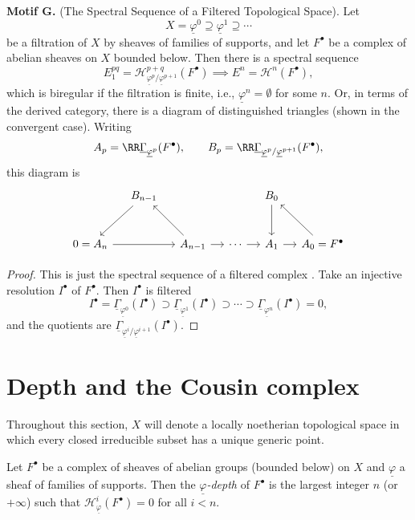 \medskip{}\label{motif:4.1.G}\noindent\textbf{Motif G.} (The Spectral Sequence of a Filtered Topological Space). Let
\[
X = \underline{\varphi}^0 \supseteq \underline{\varphi}^1 \supseteq \cdots
\]
be a filtration of $X$ by sheaves of families of supports, and let $F^\bullet$ be a complex of abelian sheaves on $X$ bounded below. Then there is a spectral sequence
\[
E_1^{pq}=\mathcal{H}^{p+q}_{\underline{\varphi}^p/\underline{\varphi}^{p+1}}(F^\bullet)\implies E^n=\mathcal{H}^n(F^\bullet),
\]
which is biregular \cite[\nopp $0_{\mathrm{III}}$, \S11]{EGA} if the filtration is finite, i.e., $\underline{\varphi}^n=\emptyset$ for some $n$. Or, in terms of the derived category, there is a diagram of distinguished triangles (shown in the convergent case).
Writing
\[
A_p=\RR\underline{\Gamma}_{\underline{\varphi}^p}(F^\bullet),
\qquad B_p=\RR\underline{\Gamma}_{\underline{\varphi}^p/\underline{\varphi}^{p+1}}(F^\bullet),
\]
this diagram is
\[
\begin{tikzcd}[row sep=large, column sep=small]
 & B_{n-1} \arrow[dl] & & & B_0 \arrow[d] & \\
0=A_n \arrow[rr] & & A_{n-1} \arrow[ul] \arrow[r]
 & \cdots \arrow[r] & A_1 \arrow[r] & A_0=F^\bullet \arrow[ul]
\end{tikzcd}
\]
\begin{proof}
This is just the spectral sequence of a filtered complex \cite[\nopp Ch.~XV]{M}. Take an injective resolution $I^\bullet$ of $F^\bullet$. Then $I^\bullet$ is filtered
\[
I^\bullet = \underline{\Gamma}_{\underline{\varphi}^0}(I^\bullet)\supset \underline{\Gamma}_{\underline{\varphi}^1}(I^\bullet)\supset \cdots \supset \underline{\Gamma}_{\underline{\varphi}^n}(I^\bullet)=0,
\]
and the quotients are $\underline{\Gamma}_{\underline{\varphi}^i/\underline{\varphi}^{i+1}}(I^\bullet)$.
\end{proof}

\section{Depth and the Cousin complex}\label{sec:4.2}

Throughout this section, $X$ will denote a locally noetherian topological space in which every closed irreducible subset has a unique generic point.

\begin{definition*}
Let $F^\bullet$ be a complex of sheaves of abelian groups (bounded below) on $X$ and $\underline{\varphi}$ a sheaf of families of supports. Then the \emph{$\underline{\varphi}$-depth} of $F^\bullet$ is the largest integer $n$ (or $+\infty$) such that $\mathcal{H}^{i}_{\underline{\varphi}}(F^\bullet)=0$ for all $i<n$.
\end{definition*}

